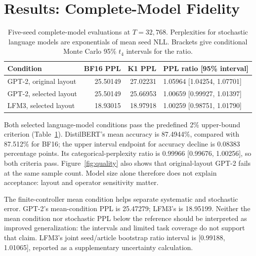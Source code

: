 \documentclass[11pt]{article}
\begin{document}
\section{Results: Complete-Model Fidelity}
\begin{table}[!htbp]\centering\small
\caption{Five-seed complete-model evaluations at $T=32{,}768$. Perplexities for stochastic language models are exponentials of mean seed NLL. Brackets give conditional Monte Carlo 95\% $t_4$ intervals for the ratio.}\label{tab:results}
\begin{tabular}{lrrl}\toprule
Condition & BF16 PPL & K1 PPL & PPL ratio [95\% interval]\\\midrule
GPT-2, original layout & 25.50149 & 27.02231 & 1.05964 [1.04254, 1.07701]\\
GPT-2, selected layout & 25.50149 & 25.66953 & 1.00659 [0.99927, 1.01397]\\
LFM3, selected layout & 18.93015 & 18.97918 & 1.00259 [0.98751, 1.01790]\\\bottomrule
\end{tabular}
\end{table}

Both selected language-model conditions pass the predefined 2\% upper-bound criterion (Table~\ref{tab:results}). DistilBERT's mean accuracy is 87.4944\%, compared with 87.512\% for BF16; the upper interval endpoint for accuracy decline is 0.08383 percentage points. Its categorical-perplexity ratio is 0.99966 [0.99676, 1.00256], so both criteria pass. Figure~\ref{fig:quality} also shows that original-layout GPT-2 fails at the same sample count. Model size alone therefore does not explain acceptance: layout and operator sensitivity matter.


The finite-controller mean condition helps separate systematic and stochastic error. GPT-2's mean-condition PPL is 25.47279; LFM3's is 18.95199. Neither the mean condition nor stochastic PPL below the reference should be interpreted as improved generalization: the intervals and limited task coverage do not support that claim. LFM3's joint seed/article bootstrap ratio interval is [0.99188, 1.01065], reported as a supplementary uncertainty calculation.
\end{document}
